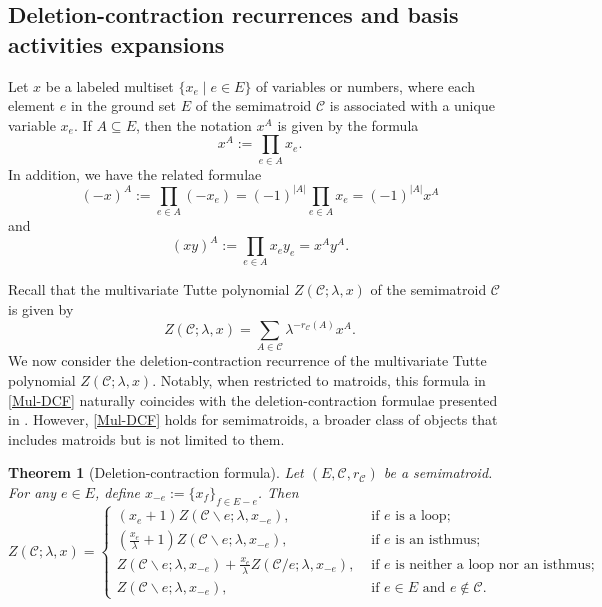 \documentclass[12pt]{article}%
\renewcommand*{\bm}[1]{#1}%
\numberwithin{equation}{section}
\newtheorem{theorem}{Theorem}[section]
\begin{document}
\subsection{Deletion-contraction recurrences and basis activities expansions }\label{Sec-2-1}
Let $\bm x$ be a labeled multiset $\{x_e\mid e\in E\}$ of variables or numbers, where each element $e$ in the ground set $E$ of the semimatroid $\mathcal{C}$ is associated with a unique variable $x_e$. If $A\subseteq E$, then the notation $\bm x^A$ is given by the formula
\[
\bm x^A:=\prod_{e\in A}x_e.
\]
In addition, we have the related formulae
\[
(-\bm x)^A:=\prod_{e\in A}(-x_e)=(-1)^{|A|}\prod_{e\in A}x_e=(-1)^{|A|}\bm x^A
\]
and 
\[
(\bm x\bm y)^A:=\prod_{e\in A}x_ey_e=\bm x^A\bm y^A.
\]

Recall that the multivariate Tutte polynomial $Z(\mathcal{C};\lambda,\bm x)$ of the semimatroid $\mathcal{C}$ is given by
\[
Z(\mathcal{C};\lambda,\bm x)=\sum_{A\in\mathcal{C}}\lambda^{-r_\mathcal{C}(A)}\bm x^A.
\]
We now consider the deletion-contraction recurrence of the multivariate Tutte polynomial $Z(\mathcal{C};\lambda,\bm x)$. Notably, when restricted to matroids, this formula in \autoref{Mul-DCF} naturally coincides with the deletion-contraction formulae presented in \cite[(4.18a) and (4.18b)]{Sokal2005}. However, \autoref{Mul-DCF} holds for semimatroids, a broader class of objects that includes matroids but is not limited to them. 
\begin{theorem}[Deletion-contraction formula]\label{Mul-DCF}
Let $(E,\mathcal{C},r_{\mathcal{C}})$ be a semimatroid. For any $e\in E$, define $\bm x_{-e}:=\{x_f\}_{f\in E-e}$. Then 
\[
Z(\mathcal{C};\lambda,\bm x)=
\begin{cases}
(x_e+1)Z(\mathcal{C}\backslash e;\lambda,\bm x_{-e}),&\text{ if } e \text{ is a loop};\\
(\frac{x_e}{\lambda}+1)Z(\mathcal{C}\backslash e;\lambda,\bm x_{-e}),&\text{ if } e \text{ is an isthmus};\\
Z(\mathcal{C}\backslash e;\lambda,\bm x_{-e})+\frac{x_e}{\lambda}Z(\mathcal{C}/e;\lambda,\bm x_{-e}),&\text{ if } e \text{ is neither a loop nor an isthmus};\\
Z(\mathcal{C}\backslash e;\lambda,\bm x_{-e}),&\text{ if } e\in E \text{ and } e\notin\mathcal{C}.
\end{cases}
\]
\end{theorem}
\end{document}
